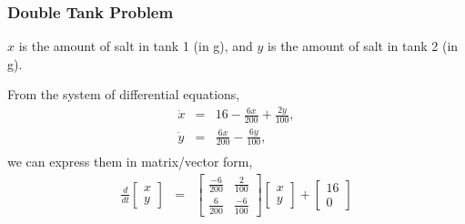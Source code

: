 \begin{frame}
  \frametitle{Double Tank Problem}

    $x$ is the amount of salt in tank 1 (in g), and $y$ is the amount of salt in tank 2 (in g).

    From the system of differential equations,
    \begin{eqnarray*}
      \dot{x} & = & 16 - \frac{6x}{200} + \frac{2y}{100}, \\
      \dot{y} & = &  \frac{6x}{200} - \frac{6y}{100}, \\
    \end{eqnarray*}
    we can express them in matrix/vector form,
    \begin{eqnarray*}
      \frac{d}{dt} \left[
        \begin{array}{l}
          x \\ y
        \end{array}
      \right]
      & = & 
      \left[
        \begin{array}{ll}
          \frac{-6}{200} & \frac{2}{100}  \\ 
          \frac{6}{200}   & \frac{-6}{100} 
        \end{array}
      \right]
      \left[
        \begin{array}{l}
          x \\ y
        \end{array}
        \right]
        +
        \left[
        \begin{array}{l}
          16 \\ 0
        \end{array}
        \right]
    \end{eqnarray*}


\end{frame}




